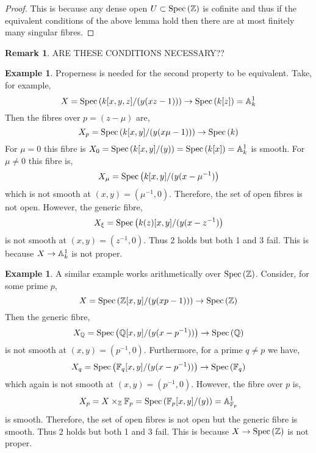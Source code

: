 \documentclass[12pt]{extarticle}
\newcommand{\Z}{\mathbb{Z}}
\theoremstyle{definition}
\newtheorem{example}[theorem]{Example}
\newtheorem{remark}{Remark}
\begin{document}
\begin{proof}
This is because any dense open $U \subset \Spec{\Z}$ is cofinite and thus if the equivalent conditions of the above lemma hold then there are at most finitely many singular fibres. 
\end{proof}

\begin{remark}
ARE THESE CONDITIONS NECESSARY?? 
\end{remark}

\begin{example}
Properness is needed for the second property to be equivalent. Take, for example,
\[ X = \mathrm{Spec}\left(k[x, y, z]/(y(xz - 1))\right) \to \mathrm{Spec}\left(k[z]\right) = \mathbb{A}^1_k \]
Then the fibres over $p = (z - \mu)$ are,
\[ X_p = \mathrm{Spec}\left(k[x,y]/(y(x\mu - 1))\right) \to \mathrm{Spec}\left(k\right) \]
For $\mu = 0$ this fibre is $X_{0} = \mathrm{Spec}\left(k[x,y]/(y)\right) = \mathrm{Spec}\left(k[x]\right) = \mathbb{A}^1_k$ is smooth. For $\mu \neq 0$ this fibre is,
\[ X_\mu = \mathrm{Spec}\left(k[x,y]/(y(x - \mu^{-1})\right) \]
which is not smooth at $(x,y) = (\mu^{-1},0)$. Therefore, the set of open fibres is not open. However, the generic fibre,
\[ X_\xi = \mathrm{Spec}\left(k(z)[x,y]/(y(x - z^{-1})\right) \]
is not smooth at $(x,y) = (z^{-1}, 0)$. Thus 2 holds but both 1 and 3 fail. This is because $X \to \mathbb{A}^1_k$ is not proper. 
\end{example}

\begin{example}
A similar example works arithmetically over $\Spec{\Z}$. Consider, for some prime $p$,
\[ X = \Spec{\Z[x,y]/(y(xp - 1))} \to \Spec{\Z} \]
Then the generic fibre,
\[ X_{\mathbb{Q}} = \mathrm{Spec}\left(\mathbb{Q}[x,y]/(y(x - p^{-1}))\right) \to \mathrm{Spec}\left(\mathbb{Q}\right) \]
is not smooth at $(x,y) = (p^{-1}, 0)$. Furthermore, for a prime $q \neq p$ we have,
\[ X_q = \mathrm{Spec}\left(\mathbb{F}_q[x,y]/(y(x - p^{-1}))\right) \to \mathrm{Spec}\left(\mathbb{F}_q\right) \]
which again is not smooth at $(x, y) = (p^{-1}, 0)$. However, the fibre over $p$ is,
\[ X_p = X \times_\Z \mathbb{F}_p = \Spec{\mathbb{F}_p[x,y]/(y)} = \A^1_{\mathbb{F}_p} \]
is smooth. Therefore, the set of open fibres is not open but the generic fibre is smooth. Thus 2 holds but both 1 and 3 fail. This is because $X \to \Spec{\Z}$ is not proper. 
\end{example}
\end{document}
